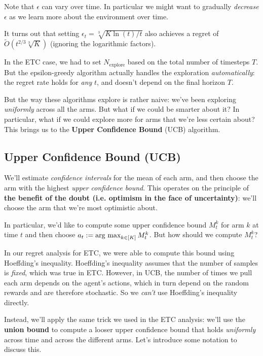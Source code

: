 \documentclass[\main/main]{subfiles}
\begin{document}
Note that $\epsilon$ can vary over time. In particular we might want to gradually \emph{decrease} $\epsilon$ as we learn more about the environment over time.

It turns out that setting $\epsilon_t = \sqrt[3]{K \ln(t)/t}$ also achieves a regret of $\tilde O(t^{2/3} \sqrt[3]{K})$ (ignoring the logarithmic factors).


In the ETC case, we had to set $N_{\text{explore}}$ based on the total number of timesteps $T$. But the epsilon-greedy algorithm actually handles the exploration \emph{automatically}: the regret rate holds for \emph{any} $t$, and doesn't depend on the final horizon $T$.

But the way these algorithms explore is rather naive: we've been exploring \emph{uniformly} across all the arms. But what if we could be smarter about it? In particular, what if we could explore more for arms that we're less certain about? This brings us to the \textbf{Upper Confidence Bound} (UCB) algorithm.


\subsection{Upper Confidence Bound (UCB)}



We'll estimate \emph{confidence intervals} for the mean of each arm, and then choose the arm with the highest \emph{upper confidence bound}. This operates on the principle of \textbf{the benefit of the doubt (i.e. optimism in the face of uncertainty)}: we'll choose the arm that we're most optimistic about.

In particular, we'd like to compute some upper confidence bound $M^k_t$ for arm $k$ at time $t$ and then choose $a_t := \operatorname*{\textrm{arg\ max}}_{k \in [K]} M^k_t$. But how should we compute $M^k_t$?

In our regret analysis for ETC, we were able to compute this bound using Hoeffding's inequality. Hoeffding's inequality assumes that the number of samples is \emph{fixed}, which was true in ETC. However, in UCB, the number of times we pull each arm depends on the agent's actions, which in turn depend on the random rewards and are therefore stochastic. So we \emph{can't} use Hoeffding's inequality directly.

Instead, we'll apply the same trick we used in the ETC analysis: we'll use the \textbf{union bound} to compute a looser upper confidence bound that holds \emph{uniformly} across time and across the different arms. Let's introduce some notation to discuss this.
\end{document}
